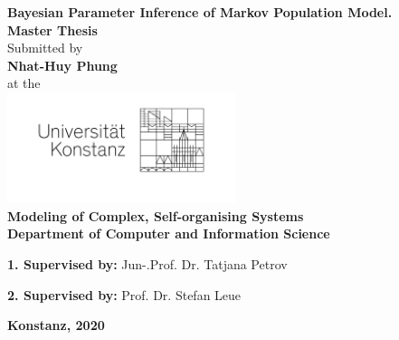 \begin{titlepage}
  \begin{center}
    {\LARGE \textbf{Bayesian Parameter Inference of Markov Population Model.}}
    \\[1cm]
    {\Large \textbf{Master Thesis}}
    \\[1cm]
    {\Large Submitted by}
    \\[0.5cm]
    {\LARGE \textbf{Nhat-Huy Phung}}
    \\[0.5cm]
    {\Large at the}
    \\[0.5cm]
    \includegraphics[width=0.5\textwidth]{figures/unisignet-klein.jpg}
    \\[1cm]
    {\large \textbf{Modeling of Complex, Self-organising Systems}}
    \\[1cm]
    {\large \textbf{Department of Computer and Information Science}}
    \\[2cm]
    \begin{minipage}[c]{\textwidth}
      \begin{description}[style=multiline]
      \item {\large \textbf{1. Supervised by:} Jun-.Prof. Dr. Tatjana Petrov }
      \item {\large \textbf{2. Supervised by:} Prof. Dr. Stefan Leue }
      \end{description}
    \end{minipage}
    \vfill
    {\LARGE \textbf{Konstanz, 2020}}
  \end{center}
\end{titlepage}
